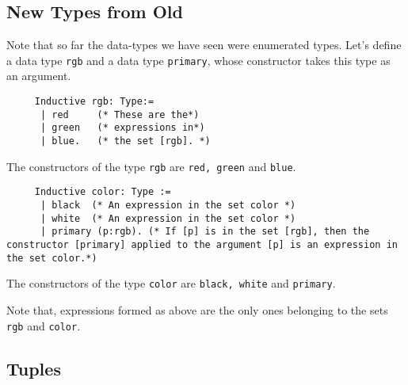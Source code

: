 \subsection{New Types from Old}
     
     
	 Note that so far the data-types we have seen were enumerated types.
	 Let's define a data type \lstinline!rgb! and a data type \lstinline!primary!, whose constructor takes this type as an argument.
	 
    \begin{minipage}[t]{0.45\textwidth}
	\begin{lstlisting}
	 Inductive rgb: Type:=
	  | red     (* These are the*)
	  | green   (* expressions in*)
	  | blue.   (* the set [rgb]. *)
	 \end{lstlisting}
	 The constructors of the type \lstinline!rgb! are \lstinline!red, green! and \lstinline!blue!. 
	 \end{minipage}
	 \hfill	 
	 \begin{minipage}[t]{0.45\textwidth}
	 \begin{lstlisting}
	 Inductive color: Type := 
	  | black  (* An expression in the set color *)
	  | white  (* An expression in the set color *)
	  | primary (p:rgb). (* If [p] is in the set [rgb], then the constructor [primary] applied to the argument [p] is an expression in the set color.*) 
	 \end{lstlisting}
	 The constructors of the type \lstinline!color! are \lstinline!black, white! and \lstinline!primary!.\\
	 \end{minipage}	 	 
	 
	 Note that, expressions formed as above are the only ones belonging to the sets \lstinline!rgb! and \lstinline!color!.
	 

\subsection{Tuples}


